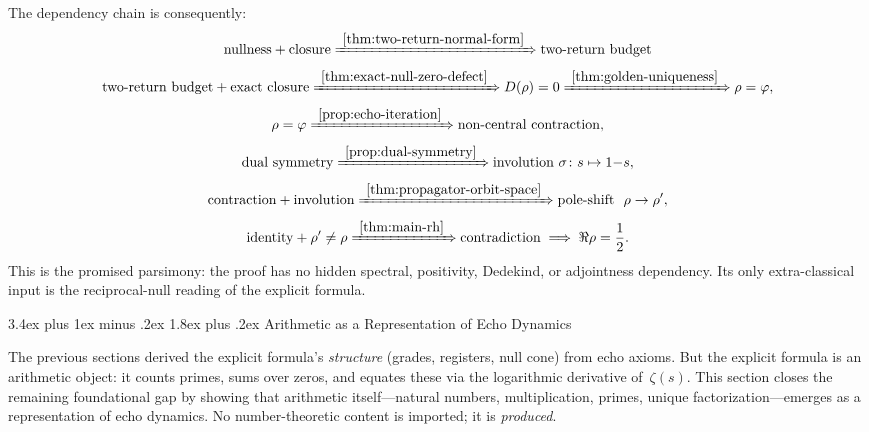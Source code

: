 \documentclass[11pt,a4paper]{article}
\makeatletter
\theoremstyle{plain}
\theoremstyle{definition}
\theoremstyle{remark}
\numberwithin{equation}{section}
\newcommand{\vp}{\varphi}
\renewcommand{\section}{%
  \@startsection{section}{1}{0pt}%
    {3.4ex plus 1ex minus .2ex}%
    {1.8ex plus .2ex}%
    {\normalfont\LARGE\bfseries\color{headingAccent}}%
}
\makeatother
\begin{document}
The dependency chain is consequently:
\[
\begin{gathered}
\hbox{nullness}+\hbox{closure}
\xRightarrow{\ \cref{thm:two-return-normal-form}\ }
\hbox{two-return budget}\\
\hbox{two-return budget}+\hbox{exact closure}
\xRightarrow{\ \cref{thm:exact-null-zero-defect}\ }
D(\rho)=0
\xRightarrow{\ \cref{thm:golden-uniqueness}\ }
\rho=\vp,\\
\rho=\vp
\xRightarrow{\ \cref{prop:echo-iteration}\ }
\hbox{non-central contraction},\\
\hbox{dual symmetry}
\xRightarrow{\ \cref{prop:dual-symmetry}\ }
\hbox{involution }\sigma\colon s\mapsto1{-}s,\\
\hbox{contraction}+\hbox{involution}
\xRightarrow{\ \cref{thm:propagator-orbit-space}\ }
\hbox{pole-shift }\ \rho\to\rho',\\
\hbox{identity}+\rho'\ne\rho
\xRightarrow{\ \cref{thm:main-rh}\ }
\hbox{contradiction}\implies\Re\rho=\frac12.
\end{gathered}
\]
This is the promised parsimony: the proof has no hidden spectral,
positivity, Dedekind, or adjointness dependency.  Its only extra-classical
input is the reciprocal-null reading of the explicit formula.

\section{Arithmetic as a Representation of Echo Dynamics}
\label{sec:arithmetic-emergence}

The previous sections derived the explicit formula's \emph{structure}
(grades, registers, null cone) from echo axioms.  But the explicit
formula is an arithmetic object: it counts primes, sums over zeros,
and equates these via the logarithmic derivative of~\(\zeta(s)\).
This section closes the remaining foundational gap by showing that
arithmetic itself---natural numbers, multiplication, primes, unique
factorization---emerges as a representation of echo dynamics.  No
number-theoretic content is imported; it is \emph{produced}.
\end{document}
